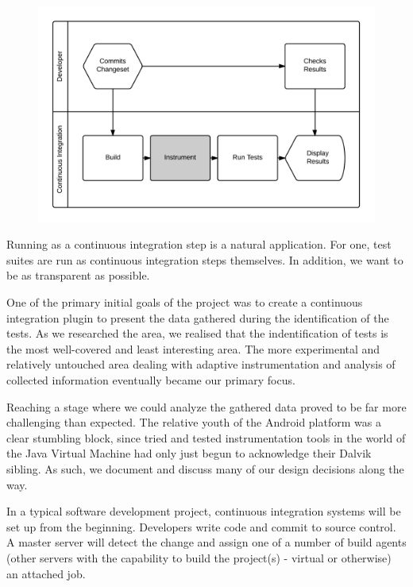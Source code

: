 \begin{figure}[h]

\includegraphics[width=\linewidth]{Images/developer_workflow}

\caption{}
\label{fig:developer_workflow}
\end{figure}

Running as a continuous integration step is a natural application. For one, test
suites are run as continuous integration steps themselves. In addition, we want
to be as transparent as possible.

One of the primary initial goals of the project was to create a continuous
integration plugin to present the data gathered during the identification of the
\flaky tests. As we researched the area, we realised that the indentification of
\flaky tests is the most well-covered and least interesting area. The more
experimental and relatively untouched area dealing with adaptive instrumentation
and analysis of collected information eventually became our primary focus.

Reaching a stage where we could analyze the gathered data proved to be far more
challenging than expected. The relative youth of the Android platform was a
clear stumbling block, since tried and tested instrumentation tools in the world
of the Java Virtual Machine had only just begun to acknowledge their Dalvik
sibling. As such, we document and discuss many of our design decisions along the
way.

In a typical software development project, continuous integration systems will
be set up from the beginning. Developers write code and commit to source
control. A master server will detect the change and assign one of a number of
build agents (other servers with the capability to build the project(s) -
virtual or otherwise) an attached job.

